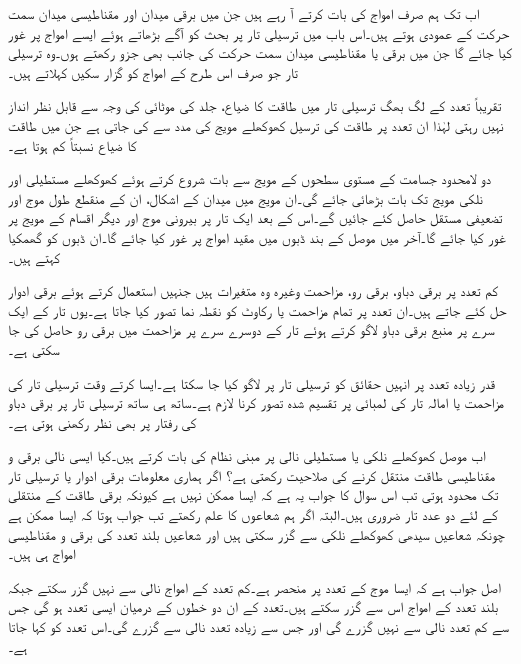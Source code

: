اب تک ہم صرف    امواج کی بات کرتے آ رہے ہیں جن میں برقی  میدان اور مقناطیسی میدان سمت حرکت کے عمودی ہوتے ہیں۔اس باب میں ترسیلی تار پر بحث کو آگے بڑھاتے ہوئے ایسے امواج پر غور کیا جائے گا جن میں برقی یا مقناطیسی میدان سمت حرکت کی جانب بھی جزو رکھتے ہوں۔وہ ترسیلی تار جو صرف اس طرح کے امواج کو گزار سکیں  کہلاتے ہیں۔

تقریباً  تعدد کے لگ بھگ ترسیلی تار میں طاقت کا ضیاع، جلد کی موٹائی  کی وجہ سے قابل نظر انداز نہیں رہتی لہٰذا ان تعدد پر طاقت کی ترسیل کھوکھلے مویج کی مدد سے کی جاتی ہے جن میں طاقت کا ضیاع نسبتاً کم ہوتا ہے۔
  
دو لامحدود جسامت کے مستوی سطحوں کے مویج سے بات شروع کرتے ہوئے کھوکھلے مستطیلی اور نلکی مویج تک بات بڑھائی جائے گی۔ان مویج میں میدان کے اشکال، ان کے منقطع طول موج اور تضعیفی مستقل  حاصل کئے جائیں گے۔اس کے بعد ایک تار پر بیرونی موج  اور دیگر اقسام کے مویج پر غور کیا جائے گا۔آخر میں موصل کے بند ڈبوں میں مقید امواج پر غور کیا جائے گا۔ان ڈبوں کو گھمکیا کہتے ہیں۔

کم تعدد پر برقی دباو، برقی رو، مزاحمت وغیرہ وہ متغیرات ہیں جنہیں استعمال کرتے ہوئے برقی ادوار حل کئے جاتے ہیں۔ان تعدد پر تمام مزاحمت یا رکاوٹ کو نقطہ نما تصور کیا جاتا ہے۔یوں تار کے ایک سرے پر منبع برقی دباو لاگو کرتے ہوئے تار کے دوسرے سرے پر مزاحمت میں برقی رو حاصل کی جا سکتی ہے۔

قدر زیادہ تعدد پر انہیں حقائق کو ترسیلی تار پر لاگو کیا جا سکتا ہے۔ایسا کرتے وقت ترسیلی تار کی مزاحمت یا امالہ تار کی لمبائی پر تقسیم شدہ  تصور کرنا لازم ہے۔ساتھ ہی ساتھ ترسیلی تار پر برقی دباو کی رفتار پر بھی نظر رکھنی ہوتی ہے۔

اب موصل کھوکھلے نلکی یا مستطیلی نالی پر مبنی نظام کی بات کرتے ہیں۔کیا ایسی نالی برقی و مقناطیسی طاقت منتقل کرنے کی صلاحیت رکھتی ہے؟ اگر ہماری معلومات برقی ادوار یا ترسیلی تار تک محدود ہوتی تب اس سوال کا جواب یہ ہے کہ ایسا ممکن نہیں ہے کیونکہ برقی طاقت کے منتقلی کے لئے دو عدد تار ضروری ہیں۔البتہ اگر ہم شعاعوں کا علم رکھتے تب جواب ہوتا کہ ایسا ممکن ہے چونکہ شعاعیں سیدھی کھوکھلے نلکی سے گزر سکتی ہیں اور شعاعیں بلند تعدد  کی برقی و مقناطیسی امواج ہی ہیں۔

اصل جواب ہے کہ ایسا موج کے تعدد پر منحصر ہے۔کم تعدد کے امواج نالی سے نہیں گزر سکتے جبکہ بلند تعدد کے امواج اس سے گزر سکتے ہیں۔تعدد کے ان دو خطوں کے درمیان ایسی تعدد ہو گی جس سے کم تعدد نالی سے نہیں گزرے گی اور جس سے زیادہ تعدد نالی سے گزرے گی۔اس تعدد کو  کہا جاتا ہے۔ 

